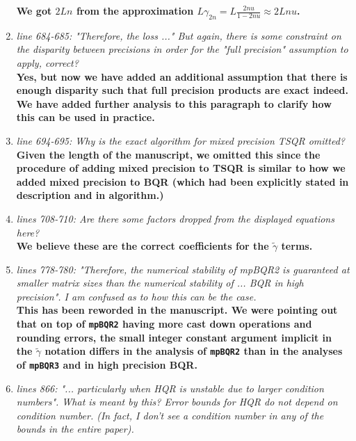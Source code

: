 \documentclass[final,onefignum,onetabnum]{siamart190516}
\newcommand{\red}[1]{\textcolor{red}{#1}}
\begin{document}
\begin{enumerate}
    {\bf We got $2Ln$ from the approximation $L\gamma_{2n}=L\frac{2nu}{1-2nu}\approx 2Lnu$.}
    \item {\it line 684-685: "Therefore, the loss ..." But again, there is some constraint on the disparity between precisions in order for the "full precision" assumption to apply, correct? }\\
    {\bf Yes, but now we have added an additional assumption that there is enough disparity such that full precision products are exact indeed. We have added further analysis to this paragraph to clarify how this can be used in practice.  }
    \item {\it line 694-695: Why is the exact algorithm for mixed precision TSQR omitted? }\\
    {\bf Given the length of the manuscript, we omitted this since the procedure of adding mixed precision to TSQR is similar to how we added mixed precision to BQR (which had been explicitly stated in description and in algorithm.)}
    \item {\it lines 708-710: Are there some factors dropped from the displayed equations here? }\\
    {\bf We believe these are the correct coefficients for the $\tilde{\gamma}$ terms.}
    \item {\it lines 778-780: "Therefore, the numerical stability of mpBQR2 is guaranteed at smaller matrix sizes than the numerical stability of ... BQR in high precision". I am confused as to how this can be the case. }\\
    {\bf This has been reworded in the manuscript. We were pointing out that on top of {\tt mpBQR2} having more cast down operations and rounding errors, the small integer constant argument implicit in the $\tilde{\gamma}$ notation differs in the analysis of {\tt mpBQR2} than in the analyses of {\tt mpBQR3} and in high precision BQR.}
    \item {\it lines 866: "... particularly when HQR is unstable due to larger condition numbers". What is meant by this? Error bounds for HQR do not depend on condition number. (In fact, I don't see a condition number in any of the bounds in the entire paper). }\\

\end{enumerate}
\end{document}
